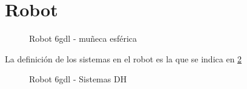 \documentclass[a4paper,12pt]{article}
\begin{document}
\section{Robot}
\begin{figure}[H]
    \centering
    \begin{adjustbox}{scale = 0.55, max width=\columnwidth}
    \end{adjustbox}
    \caption{Robot 6gdl - muñeca esférica}
    \label{robot 6gdl}
\end{figure}

La definición de los sistemas en el robot es la que se indica en \cref{sistemas DH}
\begin{figure}[H]
    \centering
    \begin{adjustbox}{scale = 0.55, max width=\columnwidth}
    \end{adjustbox}
    \caption{Robot 6gdl - Sistemas DH}
    \label{sistemas DH}
\end{figure}
\end{document}
